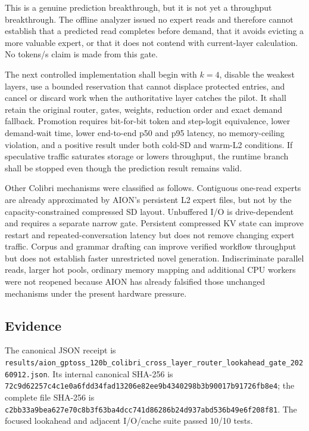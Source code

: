 This is a genuine prediction breakthrough, but it is not yet a throughput
breakthrough.  The offline analyzer issued no expert reads and therefore
cannot establish that a predicted read completes before demand, that it avoids
evicting a more valuable expert, or that it does not contend with current-layer
calculation.  No tokens/s claim is made from this gate.

The next controlled implementation shall begin with $k=4$, disable the weakest
layers, use a bounded reservation that cannot displace protected entries, and
cancel or discard work when the authoritative layer catches the pilot.  It
shall retain the original router, gates, weights, reduction order and exact
demand fallback.  Promotion requires bit-for-bit token and step-logit
equivalence, lower demand-wait time, lower end-to-end p50 and p95 latency, no
memory-ceiling violation, and a positive result under both cold-SD and warm-L2
conditions.  If speculative traffic saturates storage or lowers throughput,
the runtime branch shall be stopped even though the prediction result remains
valid.

Other Colibri mechanisms were classified as follows.  Contiguous one-read
experts are already approximated by AION's persistent L2 expert files, but not
by the capacity-constrained compressed SD layout.  Unbuffered I/O is
drive-dependent and requires a separate narrow gate.  Persistent compressed
KV state can improve restart and repeated-conversation latency but does not
remove changing expert traffic.  Corpus and grammar drafting can improve
verified workflow throughput but does not establish faster unrestricted novel
generation.  Indiscriminate parallel reads, larger hot pools, ordinary memory
mapping and additional CPU workers were not reopened because AION has already
falsified those unchanged mechanisms under the present hardware pressure.

\subsection{Evidence}

The canonical JSON receipt is
\texttt{results/aion\_gptoss\_120b\_colibri\_cross\_layer\_router\_lookahead\_gate\_20260912.json}.
Its internal canonical SHA-256 is
\texttt{72c9d62257c4c1e0a6fdd34fad13206e82ee9b4340298b3b90017b91726fb8e4};
the complete file SHA-256 is
\texttt{c2bb33a9bea627e70c8b3f63ba4dcc741d86286b24d937abd536b49e6f208f81}.
The focused lookahead and adjacent I/O/cache suite passed 10/10 tests.

